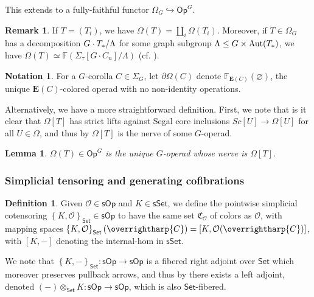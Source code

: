 \documentclass[a4paper,10pt
,draft
]{article}%
\numberwithin{equation}{section}
\numberwithin{figure}{section}
\newtheorem{lemma}[equation]{Lemma}%
\theoremstyle{definition} %
\newtheorem{definition}[equation]{Definition}%
\newtheorem{remark}[equation]{Remark}%
\newtheorem{notation}[equation]{Notation}%
\newcommand{\set}[1]{\left\{#1\right\}}%
\newcommand{\into}{\hookrightarrow}%
\newcommand{\vect}[1]{\text{\overrightharp{\ensuremath{#1}}}}
\newcommand{\Set}{\ensuremath{\mathsf{Set}}}
\newcommand{\sSet}{\ensuremath{\mathsf{sSet}}}%
\newcommand{\Op}{\mathsf{Op}}%
\newcommand{\sOp}{\ensuremath{\mathsf{sOp}}}%
\DeclareMathOperator{\Aut}{Aut}%
\renewcommand{\O}{\ensuremath{\mathcal O}}
\newcommand{\1}{\ensuremath{\mathbbm 1}}%
\begin{document}
This extends to a fully-faithful functor $\Omega_G \into \Op^G$.

\begin{remark}
      If $T = (T_i)$, we have $\Omega(T) = \amalg_i \Omega(T_i)$.
Moreover, if $T \in \Omega_G$ has a decomposition $G \cdot T_{\**}/\Lambda$ for some graph subgroup $\Lambda \leq G \times \Aut(T_{\**})$,
we have $\Omega(T) \simeq \mathbb{F} \left( \Sigma_{\tau}[G \cdot C_n]/\Lambda \right)$ (cf. \cite[\S 2.3]{BP_HGOP}).
\end{remark}

\begin{notation}
      For a $G$-corolla $C \in \Sigma_G$,
      let $\partial \Omega(C)$ denote $\mathbb F_{\boldsymbol{E}(C)}(\varnothing)$,
      the unique $\boldsymbol{E}(C)$-colored operad with no non-identity operations.
\end{notation}
Alternatively, we have a more straightforward definition.
First, we note that is it clear that $\Omega[T]$
has strict lifts against Segal core inclusions $Sc[U] \to \Omega[U]$ for all $U \in \Omega$,
and thus by \cite[Prop. 3.31 and Remark 3.42]{BP_edss} $\Omega[T]$ is the nerve of some $G$-operad.
\begin{lemma}
	$\Omega(T) \in \Op^G$ is the unique $G$-operad whose nerve is $\Omega[T]$.
\end{lemma}


\subsubsection{Simplicial tensoring and generating cofibrations}

\begin{definition}
      \label{COTENS_DEF}
      Given $\O \in \sOp$ and $K \in \sSet$, we define the pointwise simplicial cotensoring
      \( \set{K,\O}_\Set \in \sOp \) to have the same set $\mathfrak C_\O$ of colors as $\O$, with mapping spaces
      \( \set{K, \O}_\Set (\vect C) = [K, \O(\vect C)] \),
      with $[K,-]$ denoting the internal-hom in $\sSet$.            

      We note that $\set{K,-}_\Set \colon \sOp \to \sOp$ is a fibered right adjoint over $\Set$ which moreover preserves pullback arrows,
      and thus by \cite[Prop. 2.24]{BP_HGOP} there exists a left adjoint, denoted $(-) \otimes_\Set K \colon \sOp \to \sOp$,
      which is also $\Set$-fibered.                     
\end{definition}
                     
\end{document}
